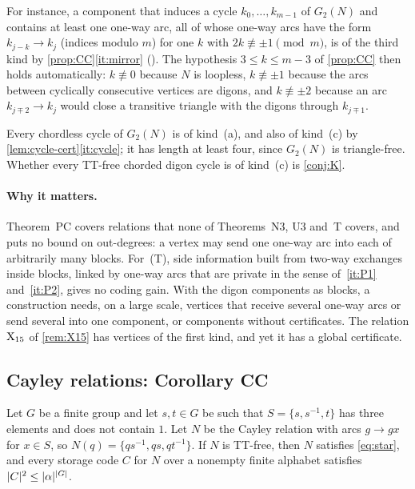 For instance, a component that induces a cycle $k_0,\dots,k_{m-1}$ of $G_2(N)$ and contains at least one one-way arc,
all of whose one-way arcs have the form $k_{j-k}\to k_j$ (indices modulo $m$) for one $k$ with $2k\not\equiv\pm1\pmod m$,
is of the third kind by \cref{prop:CC}\ref{it:mirror} (). The hypothesis $3\le k\le m-3$
of \cref{prop:CC} then holds automatically: $k\not\equiv0$ because $N$ is loopless, $k\not\equiv\pm1$ because the arcs
between cyclically consecutive vertices are digons, and $k\not\equiv\pm2$ because an arc $k_{j\mp2}\to k_j$ would close a
transitive triangle with the digons through $k_{j\mp1}$.

Every chordless cycle of $G_2(N)$ is of kind~(a), and also of kind~(c) by \cref{lem:cycle-cert}\ref{it:cycle}; it has
length at least four, since $G_2(N)$ is triangle-free. Whether every TT-free chorded digon cycle is of kind~(c) is
\cref{conj:K}.

\paragraph{Why it matters.} Theorem~PC covers relations that none of Theorems~N3, U3 and~T covers, and puts no bound on
out-degrees: a vertex may send one one-way arc into each of arbitrarily many blocks. For~(T), side information built
from two-way exchanges inside blocks, linked by one-way arcs that are private in the sense of~\ref{it:P1}
and~\ref{it:P2}, gives no coding gain. With the digon components as blocks, a construction needs, on a large scale,
vertices that receive several one-way arcs or send several into one component, or components without certificates. The
relation $\mathrm{X}_{15}$ of \cref{rem:X15} has vertices of the first kind, and yet it has a global certificate.

\subsection{Cayley relations: Corollary CC}\label{sec:CC}

\begin{corollary}\label{cor:CC}
Let $G$ be a finite group and let $s,t\in G$ be such that $S=\{s,s^{-1},t\}$ has three elements and does not contain
$1$. Let $N$ be the Cayley relation with arcs $g\to gx$ for $x\in S$, so $N(q)=\{qs^{-1},qs,qt^{-1}\}$. If $N$ is
TT-free, then $N$ satisfies \eqref{eq:star}, and every storage code $C$ for $N$ over a nonempty finite alphabet
satisfies $\lvert C \rvert^2\le\lvert \alpha \rvert^{\lvert G \rvert}$.
\end{corollary}

